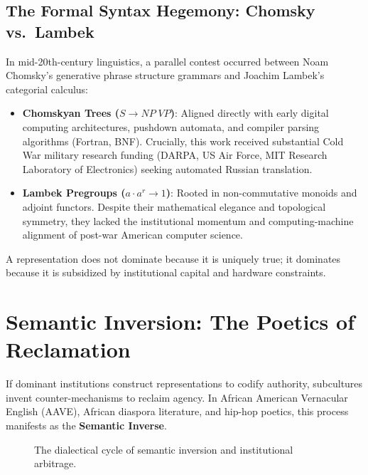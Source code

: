 \documentclass[11pt]{article}
\begin{document}
\subsection{The Formal Syntax Hegemony: Chomsky vs.\ Lambek}
In mid-20th-century linguistics, a parallel contest occurred between Noam Chomsky's generative phrase structure grammars and Joachim Lambek's categorial calculus:
\begin{itemize}
    \item \textbf{Chomskyan Trees ($S \to NP \; VP$)}: Aligned directly with early digital computing architectures, pushdown automata, and compiler parsing algorithms (Fortran, BNF). Crucially, this work received substantial Cold War military research funding (DARPA, US Air Force, MIT Research Laboratory of Electronics) seeking automated Russian translation.
    \item \textbf{Lambek Pregroups ($a \cdot a^r \to 1$)}: Rooted in non-commutative monoids and adjoint functors. Despite their mathematical elegance and topological symmetry, they lacked the institutional momentum and computing-machine alignment of post-war American computer science.
\end{itemize}

A representation does not dominate because it is uniquely true; it dominates because it is subsidized by institutional capital and hardware constraints.

\section{Semantic Inversion: The Poetics of Reclamation}

If dominant institutions construct representations to codify authority, subcultures invent counter-mechanisms to reclaim agency. In African American Vernacular English (AAVE), African diaspora literature, and hip-hop poetics, this process manifests as the \textbf{Semantic Inverse}.

\begin{figure}[h]
\centering
{}
\caption{The dialectical cycle of semantic inversion and institutional arbitrage.}
\label{fig:semantic_cycle}
\end{figure}
\end{document}
